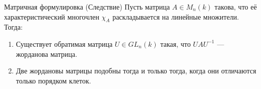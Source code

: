 \begin{Statement}{Матричная формулировка (Следствие)}{}
	Пусть матрица $A \in M_n(k)$ такова, что её характеристический многочлен $\chi_A$ раскладывается на линейные множители. Тогда:
	\begin{enumerate}
		\item Существует обратимая матрица $U \in GL_n(k)$ такая, что $U A U^{-1}$ — жорданова матрица.
		\item Две жордановы матрицы подобны тогда и только тогда, когда они отличаются только порядком клеток.
	\end{enumerate}
\end{Statement}